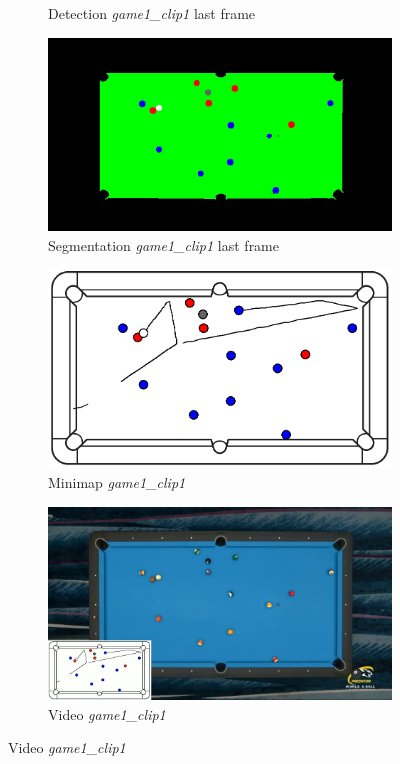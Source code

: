 \begin{figure}[H]
\begin{subfigure}[b]{0.48\textwidth}
		\caption{Detection \textit{game1\_clip1} last frame}
		\label{fig: game1_clip1_last_frame_detected}
	\end{subfigure}
	\begin{subfigure}[b]{0.48\textwidth}
		\centering
		\includegraphics[width=\textwidth]{images/Segmentation/game1_clip1_segmented_balls_last_frame.jpg}
		\caption{Segmentation \textit{game1\_clip1} last frame}
		\label{fig: game1_clip1_last_frame_segmented}
	\end{subfigure}
	\begin{subfigure}[b]{0.48\textwidth}
		\centering
		\includegraphics[width=\textwidth]{images/AllMinimap/game1_clip1_minimap.png}
		\caption{Minimap \textit{game1\_clip1}}
		\label{fig: game1_clip1_minimap}
	\end{subfigure}
	\begin{subfigure}[b]{0.48\textwidth}
		\centering
		\includegraphics[width=\textwidth]{images/Video/game1_clip1_video.jpg}
		\caption{Video \textit{game1\_clip1}}
		\label{fig: game1_clip1_video}
	\end{subfigure}


\end{figure}
